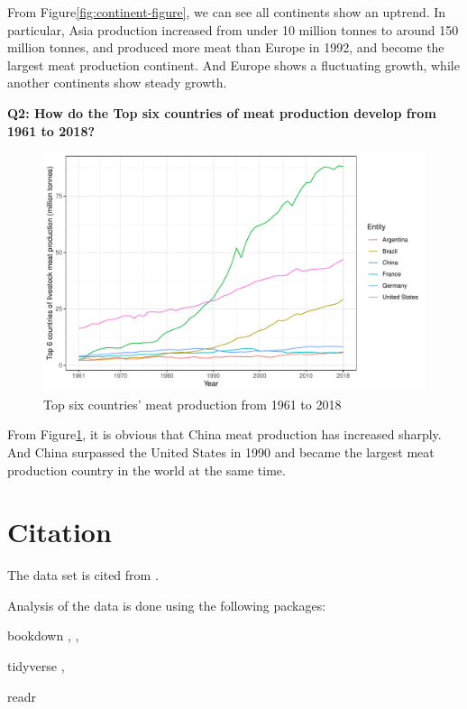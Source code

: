 \documentclass[11pt,a4paper,]{article}
\begin{document}
From Figure\ref{fig:continent-figure}, we can see all continents show an uptrend. In particular, Asia production increased from under 10 million tonnes to around 150 million tonnes, and produced more meat than Europe in 1992, and become the largest meat production continent. And Europe shows a fluctuating growth, while another continents show steady growth.

\clearpage

\textbf{Q2: How do the Top six countries of meat production develop from 1961 to 2018?}

\begin{figure}
\centering
\includegraphics{report_files/figure-latex/country-1.pdf}
\caption{\label{fig:country}Top six countries' meat production from 1961 to 2018}
\end{figure}

From Figure\ref{fig:country}, it is obvious that China meat production has increased sharply. And China surpassed the United States in 1990 and became the largest meat production country in the world at the same time.

\clearpage

\section*{Citation}

The data set is cited from \textcite{meatproduction}.

Analysis of the data is done using the following packages:

bookdown \textcite{bookdown1}, \textcite{bookdown2},

tidyverse \textcite{tidyverse},

readr \textcite{readr}

\printbibliography
\end{document}
